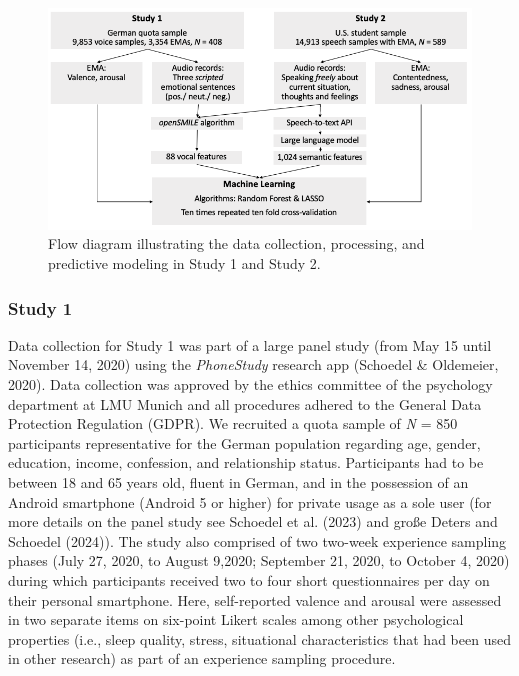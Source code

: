 \documentclass[
  english,
  man,floatsintext]{apa6}
\begin{document}
\begin{figure}

{\centering \includegraphics[width=1\linewidth]{../figures/methods_figure} 

}

\caption[Method diagram]{Flow diagram illustrating the data collection, processing, and predictive modeling in Study 1 and Study 2.}\label{fig:methodsoverview}
\end{figure}

\hypertarget{study-1}{%
\subsubsection{Study 1}\label{study-1}}

Data collection for Study 1 was part of a large panel study (from May 15 until November 14, 2020) using the \emph{PhoneStudy} research app (Schoedel \& Oldemeier, 2020). Data collection was approved by the ethics committee of the psychology department at LMU Munich and all procedures adhered to the General Data Protection Regulation (GDPR). We recruited a quota sample of \emph{N} = 850 participants representative for the German population regarding age, gender, education, income, confession, and relationship status. Participants had to be between 18 and 65 years old, fluent in German, and in the possession of an Android smartphone (Android 5 or higher) for private usage as a sole user (for more details on the panel study see Schoedel et al. (2023) and große Deters and Schoedel (2024)). The study also comprised of two two-week experience sampling phases (July 27, 2020, to August 9,2020; September 21, 2020, to October 4, 2020) during which participants received two to four short questionnaires per day on their personal smartphone. Here, self-reported valence and arousal were assessed in two separate items on six-point Likert scales among other psychological properties (i.e., sleep quality, stress, situational characteristics that had been used in other research) as part of an experience sampling procedure.
\end{document}
